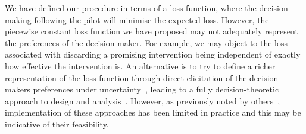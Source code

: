 \documentclass[AMA,STIX1COL]{WileyNJD-v2}
\begin{document}
We have defined our procedure in terms of a loss function, where the decision making following the pilot will minimise the expected loss. However, the piecewise constant loss function we have proposed may not adequately represent the preferences of the decision maker. For example, we may object to the loss associated with discarding a promising intervention being independent of exactly how effective the intervention is. An alternative is to try to define a richer representation of the loss function through direct elicitation of the decision makers preferences under uncertainty~\cite{French2000}, leading to a fully decision-theoretic approach to design and analysis~\cite{Lindley1997}. However, as previously noted by others~\cite{Joseph1997a, Bacchetti2008, Whitehead2008}, implementation of these approaches has been limited in practice and this may be indicative of their feasibility.




\end{document}
